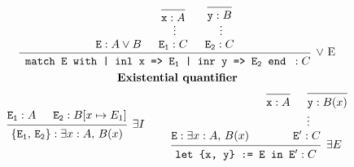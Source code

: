 \documentclass[convert, border=2pt, varwidth=8in]{standalone}
\begin{document}
\begin{spreadlines}{2em}
\begin{gather*}
\begin{prooftree}
    \hypo{\mathtt{E} : A \vee B}
    \infer0{\mathtt{x} : A} \ellipsis{}{\mathtt{E_1} : C}
    \infer0{\mathtt{y} : B} \ellipsis{}{\mathtt{E_2} : C}
    \infer3[$\vee$ E]{
        \texttt{
            match E with
            | inl x => $\mathtt{E_1}$
            | inr y => $\mathtt{E_2}$
            end
        } : C
    }
\end{prooftree}
\\ \textbf{Existential quantifier} \\
\begin{prooftree}
    \hypo{\mathtt{E_1} : A}
    \hypo{\mathtt{E_2} : B[x \mapsto E_1]}
    \infer2[$\exists I$]{\mathtt{\{E_1, \, E_2\}} : \exists x : A, \, B(x)}
\end{prooftree}
~ \qquad
\begin{prooftree}
    \hypo{\mathtt{E} : \exists x : A, \, B(x)}
    \infer0{\mathtt{x} : A}
    \infer0{\mathtt{y} : B(x)}
    \infer[no rule]2{}
    \ellipsis{}{\mathtt{E'} : C}
    \infer2[$\exists E$]{\texttt{let \{x, y\} := E in $\mathtt{E'}$} : C}
\end{prooftree}
\end{gather*}
\end{spreadlines}
\end{document}
